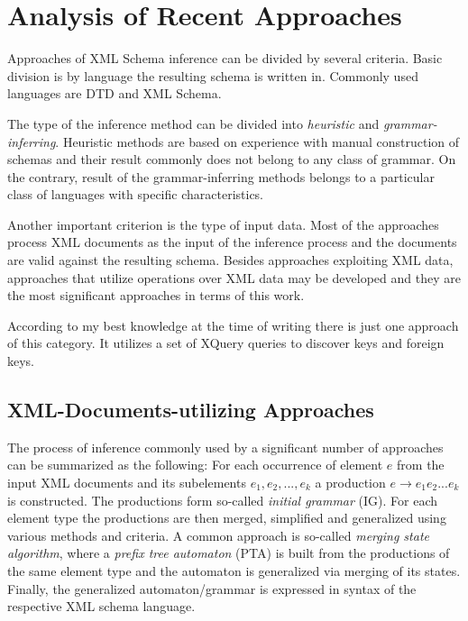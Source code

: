 \chapter{Analysis of Recent Approaches}
Approaches of XML Schema inference can be divided by several criteria. Basic division is by language the resulting schema is written in. Commonly used languages are DTD and XML Schema.

The type of the inference method can be divided into \emph{heuristic} and \emph{grammar-inferring}. Heuristic methods are based on experience with manual construction of schemas and their result commonly does not belong to any class of grammar. On the contrary, result of the grammar-inferring methods belongs to a particular class of languages with specific characteristics.

Another important criterion is the type of input data. Most of the approaches process XML documents as the input of the inference process and the documents are valid against the resulting schema. Besides approaches exploiting XML data, approaches that utilize operations over XML data may be developed and they are the most significant approaches in terms of this work.

According to my best knowledge at the time of writing there is just one approach of this category. It utilizes a set of XQuery queries to discover keys and foreign keys.

\section{XML-Documents-utilizing Approaches}
The process of inference commonly used by a significant number of approaches can be summarized as the following: For each occurrence of element $e$ from the input XML documents and its subelements $e_1, e_2, ..., e_k$ a production $e \rightarrow e_1 e_2 ... e_k$ is constructed. The productions form so-called \emph{initial grammar} (IG). For each element type the productions are then merged, simplified and generalized using various methods and criteria. A common approach is so-called \emph{merging state algorithm}, where a \emph{prefix tree automaton} (PTA) is built from the productions of the same element type and the automaton is generalized via merging of its states. Finally, the generalized automaton/grammar is expressed in syntax of the respective XML schema language.


